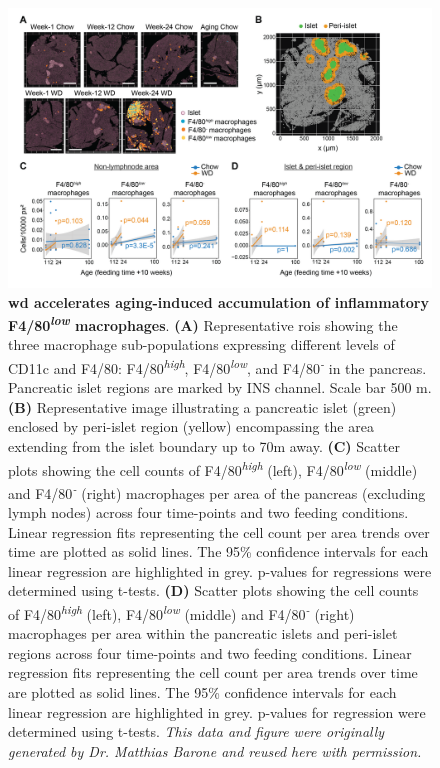 \begin{figure}[H]
    \centering
    \includegraphics[width=\linewidth]{Chapter4/Fig/F2-9-01.png}
    \caption[Accumulation of inflammatory macrophages within the pancreas]{\textbf{\gls{wd} accelerates aging-induced accumulation of inflammatory F4/80\textsuperscript{\textit{low}} macrophages}. \textbf{(A)} Representative \glspl{roi} showing the three macrophage sub-populations expressing different levels of CD11c and F4/80: F4/80\textsuperscript{\textit{high}}, F4/80\textsuperscript{\textit{low}}, and F4/80\textsuperscript{\textit{-}} in the pancreas. Pancreatic islet regions are marked by INS channel. Scale bar 500 \textmu m. \textbf{(B)} Representative image illustrating a pancreatic islet (green) enclosed by peri-islet region (yellow) encompassing the area extending from the islet boundary up to 70\textmu m away. \textbf{(C)} Scatter plots showing the cell counts of F4/80\textsuperscript{\textit{high}} (left), F4/80\textsuperscript{\textit{low}} (middle) and F4/80\textsuperscript{\textit{-}} (right) macrophages per area of the pancreas (excluding lymph nodes) across four time-points and two feeding conditions. Linear regression fits representing the cell count per area trends over time are plotted as solid lines. The 95\% confidence intervals for each linear regression are highlighted in grey. p-values for regressions were determined using t-tests. \textbf{(D)} Scatter plots showing the cell counts of F4/80\textsuperscript{\textit{high}} (left), F4/80\textsuperscript{\textit{low}} (middle) and F4/80\textsuperscript{\textit{-}} (right) macrophages per area within the pancreatic islets and peri-islet regions across four time-points and two feeding conditions. Linear regression fits representing the cell count per area trends over time are plotted as solid lines. The 95\% confidence intervals for each linear regression are highlighted in grey. p-values for regression were determined using t-tests. \textit{This data and figure were originally generated by Dr. Matthias Barone and reused here with permission.}}
    \label{fig:chp2_imc_macrophages}
\end{figure}
 
